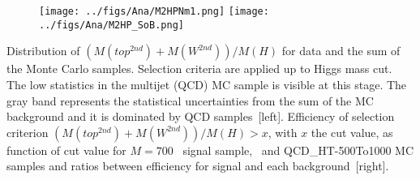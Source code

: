 \begin{frame}{}
\vspace{-.2cm}

\begin{figure}[!Hhtbp]
  \begin{center}
    \texttt{[image: ../figs/Ana/M2HPNm1.png]}
    \texttt{[image: ../figs/Ana/M2HP\_SoB.png]}
  \end{center}
\end{figure}

\vspace{-.5cm}
    \begin{block}{}
      \tiny \centering Distribution of $(M(top^{2nd})+M(W^{2nd}))/M(H)$ for data and the sum of the Monte Carlo samples. Selection criteria are applied up to Higgs mass cut. The low statistics in the multijet (QCD) MC sample is visible at this stage. The gray band represents the statistical uncertainties from the sum of the MC background and it is dominated by QCD samples~[left]. Efficiency of selection criterion $(M(top^{2nd})+M(W^{2nd}))/M(H)>x$, with $x$ the cut value, as function of cut value for $M=700$ \GeVcc~signal sample, \ttbar~and QCD\_HT-500To1000 MC samples and ratios between efficiency for signal and each background~[right].
    \end{block}

\end{frame}

